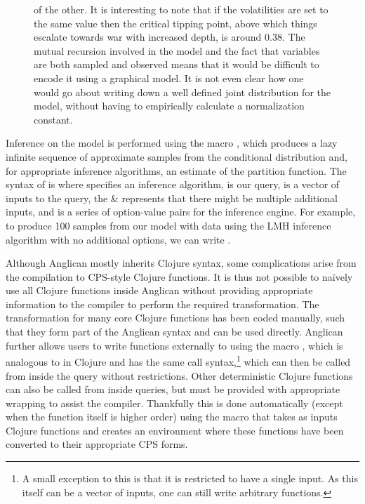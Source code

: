 \begin{figure}[p]
{of the other.  It is interesting to note that if the volatilities are set to the same value then
the critical tipping point, above which things escalate towards war with increased depth, is around $0.38$.
The mutual recursion involved in the model and the fact that variables are both sampled and 
observed means that it would be difficult to encode it using a graphical model.  It is not even clear how
one would go about writing down a well defined joint distribution for the model, without having to empirically
calculate a normalization constant.
\label{fig:probprog:schell}
		}
\end{figure}

Inference on the model is performed using the macro \doquery, which produces a lazy infinite sequence of 
approximate samples from the conditional distribution and, for appropriate inference algorithms,
an estimate of the partition function.
The syntax of \doquery is {\small {}} where {\small {}}
specifies an inference algorithm, {\small {}} is our query, {\small {}}
is a vector of inputs to the query, the \& represents that there might be multiple additional inputs, and {\small {}}
is a series of option-value pairs for the inference engine.  For example, to produce 100 samples from
our {\small {}} model with data {\small \lsi{[2.1 5.2 1.1]}} using the LMH inference algorithm with no
additional options, we can write {\small {}}.

Although Anglican mostly inherits Clojure syntax, some complications arise from the compilation to
CPS-style Clojure functions.  It is thus not possible to na\"{i}vely use all Clojure functions inside Anglican
without providing appropriate information to the compiler to perform the required transformation.
The transformation for many core Clojure functions has been coded manually, such that they form
part of the Anglican syntax and can be used directly.  Anglican further allows users to write functions externally
to  using the macro , which is analogous to  in Clojure and has the same call syntax,\footnote{A small
	exception to this is that it is restricted to have a single input.  As this itself can be a vector of inputs, one
	can still write arbitrary functions.}
which can then be called from inside the query without restrictions.  Other deterministic Clojure functions can also
be called from inside queries, but must be provided with appropriate wrapping to assist the compiler.  Thankfully
this is done automatically (except when the function itself is higher order) using the macro
{\small {}} that takes as inputs Clojure functions and creates an environment where
these functions have been converted to their appropriate CPS forms.

